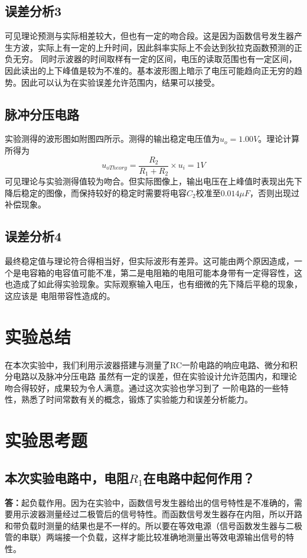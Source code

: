 \documentclass[a4paper,11pt,UTF8]{ctexart}
\begin{document}
\subsection{误差分析3}
可见理论预测与实际相差较大，但也有一定的吻合段。这是因为函数信号发生器产生方波，实际上有一定的上升时间，因此斜率实际上不会达到狄拉克函数预测的正负无穷。
同时示波器的时间取样有一定的区间，电压的读取范围也有一定区间，因此读出的上下峰值是较为不准的。基本波形图上暗示了电压可能趋向正无穷的趋势。因此可以认为在实验误差允许范围内，结果可以接受。
\subsection{脉冲分压电路}
实验测得的波形图如附图四所示。测得的输出稳定电压值为$u_o=1.00V$。理论计算所得为
\begin{equation}
  u_{oTheory}=\frac{R_2}{R_1+R_2}\times u_i=1V
\end{equation}
可见理论与实验测得值较为吻合。但实际图像上，输出电压在上峰值时表现出先下降后稳定的图像，而保持较好的稳定时需要将电容$C_2$校准至$0.014\mu F$，否则出现过补偿现象。
\subsection{误差分析4}
最终稳定值与理论符合得相当好，但实际波形有差异。这可能由两个原因造成，一个是电容箱的电容值可能不准，第二是电阻箱的电阻可能本身带有一定得容性，这也造成了如此得实验现象。实际观察输入电压，也有细微的先下降后平稳的现象，这应该是
电阻带容性造成的。
\section{实验总结}
在本次实验中，我们利用示波器搭建与测量了RC一阶电路的响应电路、微分和积分电路以及脉冲分压电路
虽然有一定的误差，但在实验设计允许范围内，和理论吻合得较好，成果较为令人满意。通过这次实验也学习到了
一阶电路的一些特性，熟悉了时间常数有关的概念，锻炼了实验能力和误差分析能力。
\newpage
\section{实验思考题}
\subsection{本次实验电路中，电阻$R_1$在电路中起何作用？}
\textbf{答：}起负载作用。因为在实验中，函数信号发生器给出的信号特性是不准确的，需要用示波器测量经过二极管后的信号特性。而函数信号发生器存在内阻，所以开路和带负载时测量的结果也是不一样的。所以要在等效电源（信号函数发生器与二极管的串联）两端接一个负载，这样才能比较准确地测量出等效电源输出信号的特性。
\end{document}
